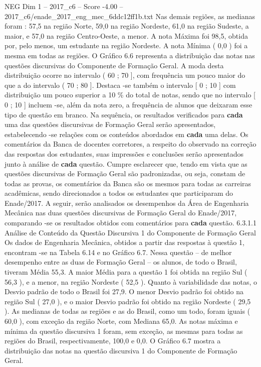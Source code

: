 \begin{textsample}{NEG Dim 1 – 2017\_c6 – Score -4.00 – 2017\_c6/enade\_2017\_eng\_mec\_6ddc12ff1b.txt}
Nas demais regiões, as medianas foram : 57,5 na região Norte, 59,0 na região Nordeste, 61,0 na região Sudeste, a maior, e 57,0 na região Centro-Oeste, a menor.
A nota Máxima foi 98,5, obtida por, pelo menos, um estudante na região Nordeste.
A nota Mínima ( 0,0 ) foi a mesma em todas as regiões.
O Gráfico 6.6 representa a distribuição das notas nas questões discursivas do Componente de Formação Geral.
A moda desta distribuição ocorre no intervalo ( 60 ; 70 ], com frequência um pouco maior do que a do intervalo ( 70 ; 80 ].
Destaca -se também o intervalo [ 0 ; 10 ] com distribuição um pouco superior a 10 \% do total de notas, sendo que no intervalo [ 0 ; 10 ] incluem -se, além da nota zero, a frequência de alunos que deixaram esse tipo de questão em branco.
Na sequência, os resultados verificados para \textbf{cada} uma das questões discursivas de Formação Geral serão apresentados, estabelecendo -se relações com os conteúdos abordados em \textbf{cada} uma delas.
Os comentários da Banca de docentes corretores, a respeito do observado na correção das respostas dos estudantes, suas impressões e conclusões serão apresentados junto à análise de \textbf{cada} questão.
Cumpre esclarecer que, tendo em vista que as questões discursivas de Formação Geral são padronizadas, ou seja, constam de todas as provas, os comentários da Banca são os mesmos para todas as carreiras acadêmicas, sendo direcionados a todos os estudantes que participaram do Enade/2017.
A seguir, serão analisados os desempenhos da Área de Engenharia Mecânica nas duas questões discursivas de Formação Geral do Enade/2017, comparando -se os resultados obtidos com comentários para \textbf{cada} questão. 6.3.1.1 Análise de Conteúdo da Questão Discursiva 1 do Componente de Formação Geral Os dados de Engenharia Mecânica, obtidos a partir das respostas à questão 1, encontram -se na Tabela 6.14 e no Gráfico 6.7.
Nessa questão – de melhor desempenho entre as duas de Formação Geral – os alunos, de todo o Brasil, tiveram Média 55,3.
A maior Média para a questão 1 foi obtida na região Sul ( 56,3 ), e a menor, na região Nordeste ( 52,5 ).
Quanto à variabilidade das notas, o Desvio padrão de todo o Brasil foi 27,9.
O menor Desvio padrão foi obtido na região Sul ( 27,0 ), e o maior Desvio padrão foi obtido na região Nordeste ( 29,5 ).
As medianas de todas as regiões e as do Brasil, como um todo, foram iguais ( 60,0 ), com exceção da região Norte, com Mediana 65,0.
As notas máxima e mínima da questão discursiva 1 foram, sem exceção, as mesmas para todas as regiões do Brasil, respectivamente, 100,0 e 0,0.
O Gráfico 6.7 mostra a distribuição das notas na questão discursiva 1 do Componente de Formação Geral.

\end{textsample}
